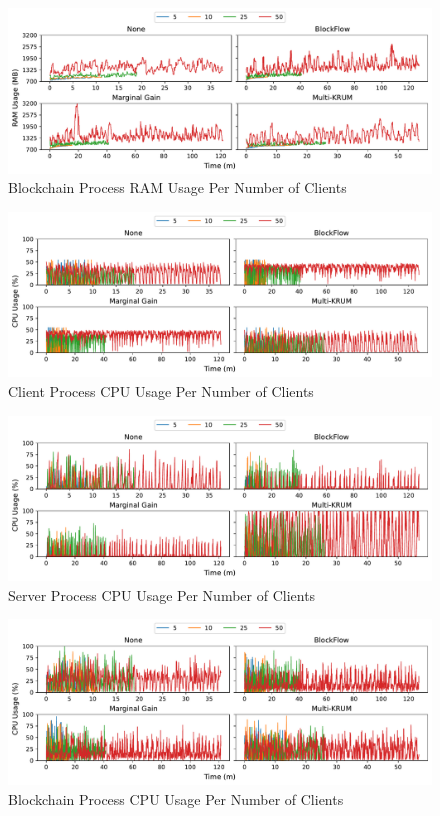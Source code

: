 \vfill

\begin{figure}[!h]
    \centering
    \includegraphics[width=\textwidth]{graphics/clients/ram_miner.pdf}
    \caption{Blockchain Process RAM Usage Per Number of Clients}
    \label{fig:ram_clients_miners}
\end{figure}

\clearpage

\begin{figure}[!h]
    \centering
    \includegraphics[width=\textwidth]{graphics/clients/cpu_client.pdf}
    \caption{Client Process CPU Usage Per Number of Clients}
    \label{fig:cpu_clients_clients}
\end{figure}

\vfill

\begin{figure}[!h]
    \centering
    \includegraphics[width=\textwidth]{graphics/clients/cpu_server.pdf}
    \caption{Server Process CPU Usage Per Number of Clients}
    \label{fig:cpu_clients_servers}
\end{figure}

\vfill

\begin{figure}[!h]
    \centering
    \includegraphics[width=\textwidth]{graphics/clients/cpu_miner.pdf}
    \caption{Blockchain Process CPU Usage Per Number of Clients}
    \label{fig:cpu_clients_miners}
\end{figure}

